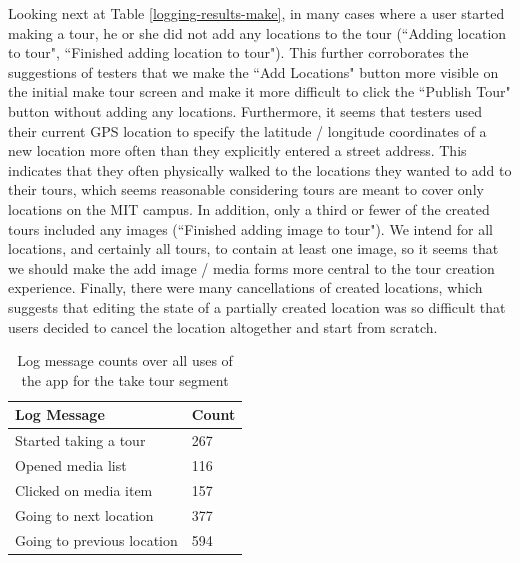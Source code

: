 \documentclass{sigchi}
\begin{document}
Looking next at Table \ref{logging-results-make}, in many cases where a user started making a tour, he or she did not add any locations to the tour (``Adding location to tour", ``Finished adding location to tour"). This further corroborates the suggestions of testers that we make the ``Add Locations" button more visible on the initial make tour screen and make it more difficult to click the ``Publish Tour" button without adding any locations. Furthermore, it seems that testers used their current GPS location to specify the latitude / longitude coordinates of a new location more often than they explicitly entered a street address. This indicates that they often physically walked to the locations they wanted to add to their tours, which seems reasonable considering tours are meant to cover only locations on the MIT campus. In addition, only a third or fewer of the created tours included any images (``Finished adding image to tour"). We intend for all locations, and certainly all tours, to contain at least one image, so it seems that we should make the add image / media forms more central to the tour creation experience. Finally, there were many cancellations of created locations, which suggests that editing the state of a partially created location was so difficult that users decided to cancel the location altogether and start from scratch.

\begin{table}
\begin{tabular}{|l|l|}\hline
\textbf{Log Message} & \textbf{Count} \\ \hline
 Started taking a tour & 267 \\ \hline
 Opened media list & 116 \\ \hline
 Clicked on media item & 157 \\ \hline
 Going to next location & 377 \\ \hline
 Going to previous location & 594 \\ \hline
\end{tabular}
\caption{Log message counts over all uses of the app for the take tour segment}
\label{logging-results-take}
\end{table}
\end{document}
